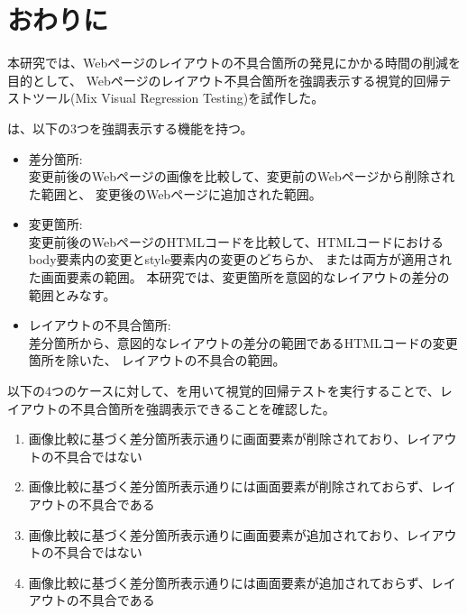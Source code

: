\chapter{おわりに}\label{cha:Conclusion}
本研究では、Webページのレイアウトの不具合箇所の発見にかかる時間の削減を目的として、
Webページのレイアウト不具合箇所を強調表示する視覚的回帰テストツール\toolName(Mix Visual Regression Testing)を試作した。
\par
\toolName は、以下の3つを強調表示する機能を持つ。
\begin{itemize}
      \item 差分箇所:\\
            変更前後のWebページの画像を比較して、変更前のWebページから削除された範囲と、
            変更後のWebページに追加された範囲。
      \item 変更箇所:\\
            変更前後のWebページのHTMLコードを比較して、HTMLコードにおけるbody要素内の変更とstyle要素内の変更のどちらか、
            または両方が適用された画面要素の範囲。
            本研究では、変更箇所を意図的なレイアウトの差分の範囲とみなす。
      \item レイアウトの不具合箇所:\\
            差分箇所から、意図的なレイアウトの差分の範囲であるHTMLコードの変更箇所を除いた、
            レイアウトの不具合の範囲。
\end{itemize}
\par
以下の4つのケースに対して、\toolName を用いて視覚的回帰テストを実行することで、レイアウトの不具合箇所を強調表示できることを確認した。
\begin{enumerate}[label=ケース\arabic*., leftmargin=1.8cm]
      \setlength{\itemsep}{0pt}
            \setlength{\parsep}{0pt}
      \item 画像比較に基づく差分箇所表示通りに画面要素が削除されており、レイアウトの不具合ではない
      \item 画像比較に基づく差分箇所表示通りには画面要素が削除されておらず、レイアウトの不具合である
      \item 画像比較に基づく差分箇所表示通りに画面要素が追加されており、レイアウトの不具合ではない
      \item 画像比較に基づく差分箇所表示通りには画面要素が追加されておらず、レイアウトの不具合である
\end{enumerate}
